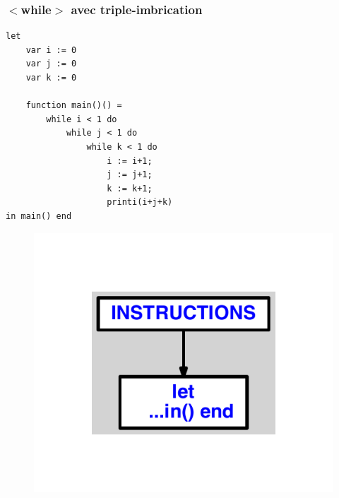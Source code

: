 \documentclass{article}
\begin{document}
\subsubsection{$ < $while$ > $ avec triple-imbrication}
\begin{lstlisting}
let
	var i := 0
	var j := 0
	var k := 0

	function main()() =
		while i < 1 do
			while j < 1 do
				while k < 1 do
					i := i+1;
					j := j+1;
					k := k+1;
					printi(i+j+k)
in main() end
\end{lstlisting}
\newpage
\begin{figure}[H]
\centering
\includegraphics[max width=\textwidth]{ast/ast_337.pdf}
\end{figure}
\newpage
\end{document}
